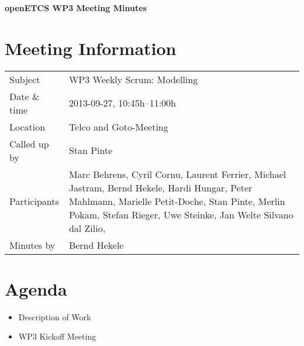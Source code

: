 \documentclass[a4paper, 11pt]{article}
\begin{document}
{\begin{center}\huge\bf openETCS WP3 Meeting Minutes\end{center}}
\section{Meeting Information}

\renewcommand{\arraystretch}{1.5}
\begin{supertabular}{m{.2\textwidth}m{.8\textwidth}}
Subject & WP3 Weekly Scrum: Modelling\\
Date \& time & 2013-09-27, 10:45h--11:00h\\
Location & Telco and Goto-Meeting\\
Called up by & Stan Pinte\\
Participants &
Marc Behrens,
Cyril Cornu,
Laurent Ferrier,
Michael Jastram,
Bernd Hekele,
Hardi Hungar,
Peter Mahlmann,
Marielle Petit-Doche,
Stan Pinte,
Merlin Pokam,
Stefan Rieger,
Uwe Steinke,
Jan Welte
Silvano dal Zilio,
\\

Minutes by & Bernd Hekele\\

\end{supertabular}
\renewcommand{\arraystretch}{1.0}


\section{{Agenda}}
\begin{itemize}
\item Description of Work
\item WP3 Kickoff Meeting
\end{itemize}
\end{document}
